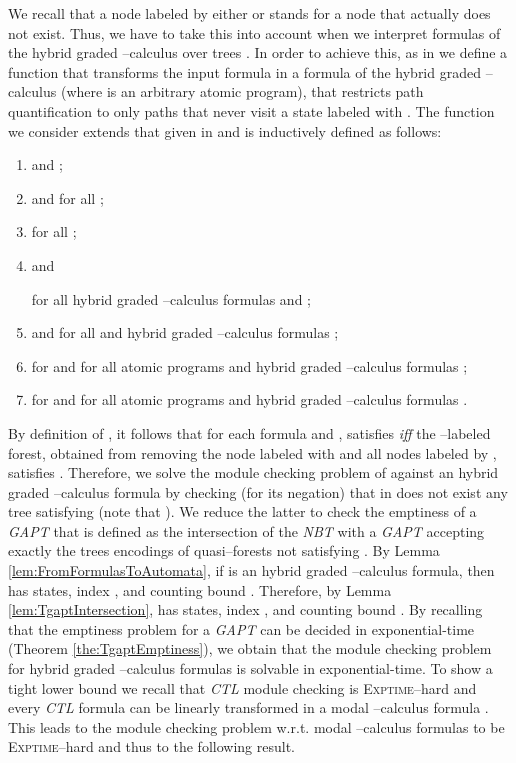 \documentclass{LMCS}
\theoremstyle{plain}
\def \CTL           {\emph{CTL}\xspace}
\def \EXPTIME       {\textsc{Exptime}\xspace}
\def \GAPT          {\emph{GAPT}\xspace}
\def \NBT           {\emph{NBT}\xspace}
\begin{document}
We recall that a node labeled by either  or 
stands for a node that actually does not exist. Thus, we have to
take this into account when we interpret formulas of the hybrid
graded --calculus over trees . In order to achieve this, as in \cite{KVW01}
we define a function  that transforms the input formula
 in a formula of the hybrid graded --calculus
 (where  is
an arbitrary atomic program), that restricts path quantification
to only paths that never visit a state labeled with .
The function  we consider extends that given in \cite{KVW01}
and is inductively defined as follows:
\begin{enumerate}[]
\item
 and ;

\item
 and  for all ;

\item
 for all ;

\item
 and

for all hybrid graded --calculus formulas  and
;

\item
 and  for all  and hybrid
graded --calculus formulas ;

\item

for  and for all atomic programs  and hybrid
graded --calculus formulas ;

\item
 for  and for all atomic programs  and hybrid graded
--calculus formulas .
\end{enumerate}

By definition of , it follows that for each formula 
and , 
satisfies  \emph{iff} the
--labeled forest, obtained from 
removing the node labeled with  and all nodes labeled by
, satisfies . Therefore, we solve the module
checking problem of  against an hybrid graded --calculus
formula  by checking (for its negation) that in
 does not exist any tree
 satisfying  (note that ). We reduce the latter to check the
emptiness of a \GAPT  that
is defined as the intersection of the \NBT  with a \GAPT
 accepting exactly the  trees encodings of quasi--forests not
satisfying . By Lemma
\ref{lem:FromFormulasToAutomata}, if  is an hybrid graded
--calculus formula, then  has
 states, index , and counting
bound . Therefore, by Lemma \ref{lem:TgaptIntersection},
 has
 states, index , and
counting bound . By recalling that the emptiness problem for a
\GAPT can be decided in exponential-time (Theorem
\ref{the:TgaptEmptiness}), we obtain that the module checking
problem for hybrid graded --calculus formulas is solvable in
exponential-time. To show a tight lower bound we recall that \CTL
module checking is \EXPTIME--hard \cite{KVW01} and every \CTL
formula can be linearly transformed in a modal --calculus
formula \cite{Jur98}. This leads to the module checking problem
w.r.t. modal --calculus formulas to be \EXPTIME--hard and
thus to the following result.
\end{document}
